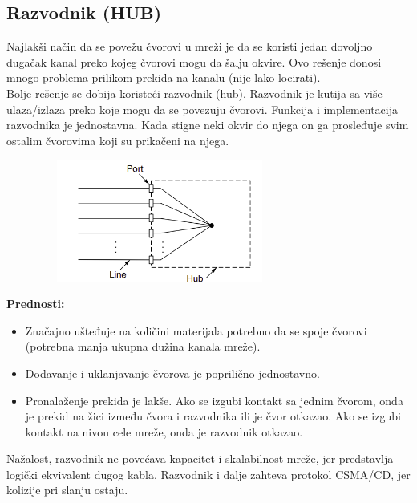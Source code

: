 \documentclass[a4paper]{article}
\begin{document}
    \subsection{Razvodnik (HUB)}
        Najlakši način da se povežu čvorovi u mreži je da se koristi jedan dovoljno dugačak kanal
        preko kojeg čvorovi mogu da šalju okvire. Ovo rešenje donosi mnogo problema prilikom
        prekida na kanalu (nije lako locirati). \\
        \indent Bolje rešenje se dobija koristeći razvodnik (hub). Razvodnik je kutija sa 
        više ulaza/izlaza preko koje mogu da se povezuju čvorovi. Funkcija i implementacija 
        razvodnika je jednostavna. Kada stigne neki okvir do njega on ga prosleđuje svim ostalim
        čvorovima koji su prikačeni na njega.
        \begin{figure}[H]
            \begin{center}
                \includegraphics[width=80mm,height=40mm]{Slike/hab.png}
            \end{center}
        \end{figure}
        \noindent \textbf{Prednosti:}
        \begin{itemize}
            \item Značajno ušteđuje na količini materijala potrebno da se spoje čvorovi (potrebna 
                  manja ukupna dužina kanala mreže). 
            \item Dodavanje i uklanjavanje čvorova je poprilično jednostavno.
            \item Pronalaženje prekida je lakše. Ako se izgubi kontakt sa jednim čvorom, onda
                  je prekid na žici između čvora i razvodnika ili je čvor otkazao. Ako se
                  izgubi kontakt na nivou cele mreže, onda je razvodnik otkazao.
        \end{itemize}
        Nažalost, razvodnik ne povećava kapacitet i skalabilnost mreže, jer predstavlja
        logički ekvivalent dugog kabla. Razvodnik i dalje zahteva protokol CSMA/CD, jer kolizije
        pri slanju ostaju. 
\end{document}
